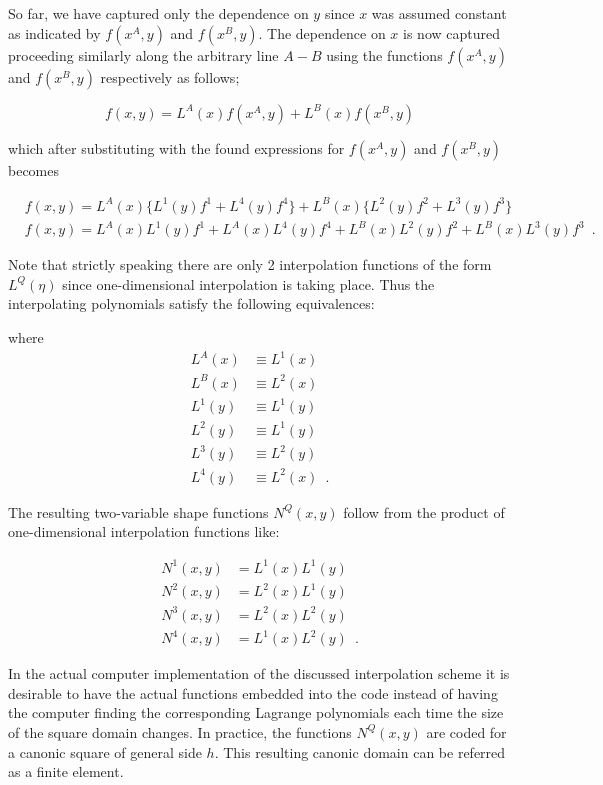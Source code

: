 So far, we have captured only the dependence on $y$ since $x$ was assumed constant as indicated by $f(x^A,y)$ and $f(x^B,y)$. The dependence on $x$ is now captured proceeding similarly along the arbitrary line $A-B$ using the functions $f(x^A,y)$ and $f(x^B,y)$ respectively as follows;

\[f(x,y) = L^A(x) f(x^A,y) + L^B(x)f(x^B,y)\]

which after substituting with the found expressions for $f(x^A,y)$ and $f(x^B,y)$ becomes

\begin{align*}
  &f(x,y) = L^A(x)\{L^1(y)f^1 + L^4(y)f^4\} + L^B(x)\{L^2(y)f^2 + L^3(y)f^3\}\\
  &f(x,y) = L^A(x)L^1(y)f^1 + L^A(x)L^4(y)f^4 + L^B(x)L^2(y)f^2 + L^B(x)L^3(y)f^3 \enspace .
\end{align*}

Note that strictly speaking there are only 2 interpolation functions of the form $L^Q(\eta)$ since one-dimensional interpolation is taking place. Thus the interpolating polynomials satisfy the following equivalences:

where
\begin{align*}
L^A(x) & \equiv L^1(x)\\
L^B(x) & \equiv L^2(x)\\
L^1(y) & \equiv L^1(y)\\
L^2(y) & \equiv L^1(y)\\
L^3(y) & \equiv L^2(y)\\
L^4(y) & \equiv L^2(x) \enspace .
\end{align*}

The resulting two-variable shape functions $N^Q(x,y)$ follow from the product of one-dimensional interpolation functions like:

\begin{align*}
N^1(x,y) & = L^1(x)L^1(y)\\
N^2(x,y) & = L^2(x)L^1(y)\\
N^3(x,y) & = L^2(x)L^2(y)\\
N^4(x,y) & = L^1(x)L^2(y) \enspace .
\end{align*}

In the actual computer implementation of the discussed interpolation scheme it is desirable to have the actual functions embedded into the code instead of having the computer finding the corresponding Lagrange polynomials each time the size of the square domain changes. In practice, the functions $N^Q(x,y)$ are coded for a canonic square of general side $h$. This resulting canonic domain can be referred as a finite element.

